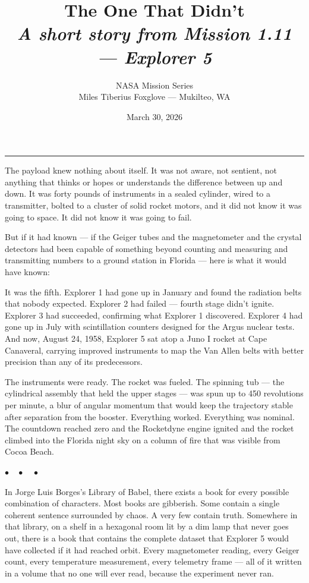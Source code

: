 \documentclass[12pt, letterpaper]{article}
\title{\Huge\textbf{The One That Didn't}\\[0.5em]\large\textit{A short story from Mission 1.11 --- Explorer 5}}
\author{NASA Mission Series\\[0.3em]\small Miles Tiberius Foxglove --- Mukilteo, WA}
\date{March 30, 2026}
\begin{document}
\maketitle
\thispagestyle{empty}

\vspace{1em}
\noindent\rule{\textwidth}{0.4pt}
\vspace{1em}

\noindent The payload knew nothing about itself. It was not aware, not sentient, not anything that thinks or hopes or understands the difference between up and down. It was forty pounds of instruments in a sealed cylinder, wired to a transmitter, bolted to a cluster of solid rocket motors, and it did not know it was going to space. It did not know it was going to fail.

But if it had known --- if the Geiger tubes and the magnetometer and the crystal detectors had been capable of something beyond counting and measuring and transmitting numbers to a ground station in Florida --- here is what it would have known:

It was the fifth. Explorer 1 had gone up in January and found the radiation belts that nobody expected. Explorer 2 had failed --- fourth stage didn't ignite. Explorer 3 had succeeded, confirming what Explorer 1 discovered. Explorer 4 had gone up in July with scintillation counters designed for the Argus nuclear tests. And now, August 24, 1958, Explorer 5 sat atop a Juno I rocket at Cape Canaveral, carrying improved instruments to map the Van Allen belts with better precision than any of its predecessors.

The instruments were ready. The rocket was fueled. The spinning tub --- the cylindrical assembly that held the upper stages --- was spun up to 450 revolutions per minute, a blur of angular momentum that would keep the trajectory stable after separation from the booster. Everything worked. Everything was nominal. The countdown reached zero and the Rocketdyne engine ignited and the rocket climbed into the Florida night sky on a column of fire that was visible from Cocoa Beach.

\begin{center}
$\bullet\quad\bullet\quad\bullet$
\end{center}

In Jorge Luis Borges's Library of Babel, there exists a book for every possible combination of characters. Most books are gibberish. Some contain a single coherent sentence surrounded by chaos. A very few contain truth. Somewhere in that library, on a shelf in a hexagonal room lit by a dim lamp that never goes out, there is a book that contains the complete dataset that Explorer 5 would have collected if it had reached orbit. Every magnetometer reading, every Geiger count, every temperature measurement, every telemetry frame --- all of it written in a volume that no one will ever read, because the experiment never ran.
\end{document}
